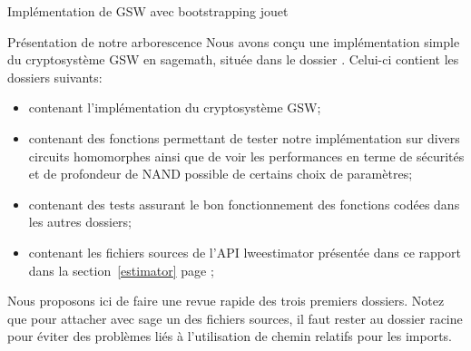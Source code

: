 \begin{section}{Implémentation de GSW avec bootstrapping \og{}jouet\fg~{}}
\begin{subsection}{Présentation de notre arborescence}
Nous avons conçu une implémentation simple du cryptosystème GSW en sagemath, située dans le dossier
. Celui-ci contient les  dossiers suivants:
\begin{itemize}
\item {} contenant l'implémentation du cryptosystème GSW;
\item {} contenant des fonctions permettant 
	de tester notre implémentation sur divers circuits homomorphes ainsi que de voir les performances en terme
	de sécurités et de profondeur de NAND possible de certains choix de paramètres;
\item {} contenant des tests assurant le bon fonctionnement
	des fonctions codées dans les autres dossiers; 
\item {} contenant les fichiers sources de l'API
	 lwe\textunderscore estimator présentée dans ce rapport dans la section~\ref{estimator} page \pageref{estimator}; 
\end{itemize}

Nous proposons ici de faire une revue rapide des trois premiers dossiers. Notez que pour
attacher avec sage un des fichiers sources, il faut rester au dossier racine pour
éviter des problèmes liés à l'utilisation de chemin relatifs pour les imports.



\end{subsection}
\end{section}
